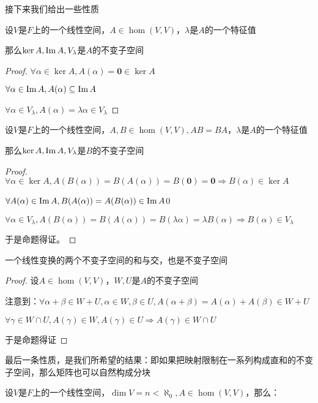 \documentclass[12pt, a4paper, oneside, UTF8]{ctexbook}
\begin{document}
			接下来我们给出一些性质
			\begin{para}{0}
				\point{}
					\begin{proposition}
						设$V$是$F$上的一个线性空间，$A \in \hom(V,V)$，$\lambda $是$A$的一个特征值

						那么$\ker A,\operatorname{Im} A,V_{\lambda }$是$A$的不变子空间
					\end{proposition}
					\begin{proof}
						$\forall \alpha \in \ker A,A(\alpha )=\mathbf{0} \in \ker A$

						$\forall \alpha \in \operatorname{Im} A,A(\alpha ) \subseteq \operatorname{Im} A$

						$\forall \alpha \in V_\lambda ,A(\alpha )=\lambda \alpha  \in V_\lambda $
					\end{proof}
				\point{}
					\begin{proposition}
						设$V$是$F$上的一个线性空间，$A,B \in \hom(V,V),AB=BA$，$\lambda $是$A$的一个特征值

						那么$\ker A,\operatorname{Im} A,V_\lambda $是$B$的不变子空间
					\end{proposition}
					\begin{proof}
						$\forall \alpha \in \ker A,A(B(\alpha ))=B(A(\alpha ))=B(\mathbf{0})=\mathbf{0} \Rightarrow B(\alpha ) \in \ker A$

						$\forall A(\alpha) \in \operatorname{Im} A,B(A(\alpha ))=A(B(\alpha )) \in \operatorname{Im} A$0

						$\forall \alpha \in V_\lambda ,A(B(\alpha))=B(A(\alpha ))=B(\lambda \alpha )=\lambda B(\alpha ) \Rightarrow B(\alpha ) \in V_\lambda $

						于是命题得证。
					\end{proof}
				\point{}
					\begin{proposition}
						一个线性变换的两个不变子空间的和与交，也是不变子空间
					\end{proposition}
					\begin{proof}
						设$A \in \hom(V,V)$，$W,U$是$A$的不变子空间

						注意到：$\forall \alpha+\beta \in W+U,\alpha \in W,\beta \in U,A(\alpha +\beta )=A(\alpha )+A(\beta ) \in W+ U$

						$\forall \gamma \in W \cap U,A(\gamma ) \in W,A(\gamma ) \in U \Rightarrow A(\gamma ) \in W \cap U$

						于是命题得证
					\end{proof}
				\point{}

					最后一条性质，是我们所希望的结果：即如果把映射限制在一系列构成直和的不变子空间，那么矩阵也可以自然构成分块
					\begin{proposition}
						设$V$是$F$上的一个线性空间，$\dim V = n < \aleph_0,A \in \hom(V,V)$，那么：


\end{proposition}
\end{para}
\end{document}
